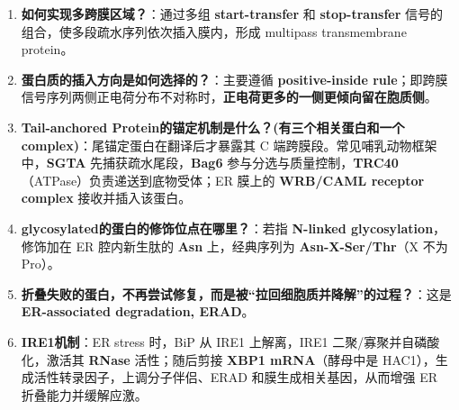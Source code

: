 \documentclass[12pt,fontset=none]{ctexart}
\begin{document}
\begin{enumerate}
\item \textbf{如何实现多跨膜区域？}：通过多组 \textbf{start-transfer} 和 \textbf{stop-transfer} 信号的组合，使多段疏水序列依次插入膜内，形成 multipass transmembrane protein。

\item \textbf{蛋白质的插入方向是如何选择的？}：主要遵循 \textbf{positive-inside rule}；即跨膜信号序列两侧正电荷分布不对称时，\textbf{正电荷更多的一侧更倾向留在胞质侧}。

\item \textbf{Tail-anchored Protein的锚定机制是什么？(有三个相关蛋白和一个complex)}：尾锚定蛋白在翻译后才暴露其 C 端跨膜段。常见哺乳动物框架中，\textbf{SGTA} 先捕获疏水尾段，\textbf{Bag6} 参与分选与质量控制，\textbf{TRC40}（ATPase）负责递送到底物受体；ER 膜上的 \textbf{WRB/CAML receptor complex} 接收并插入该蛋白。

\item \textbf{glycosylated的蛋白的修饰位点在哪里？}：若指 \textbf{N-linked glycosylation}，修饰加在 ER 腔内新生肽的 \textbf{Asn} 上，经典序列为 \textbf{Asn-X-Ser/Thr}（X 不为 Pro）。

\item \textbf{折叠失败的蛋白，不再尝试修复，而是被“拉回细胞质并降解”的过程？}：这是 \textbf{ER-associated degradation, ERAD}。

\item \textbf{IRE1机制}：ER stress 时，BiP 从 IRE1 上解离，IRE1 二聚/寡聚并自磷酸化，激活其 \textbf{RNase} 活性；随后剪接 \textbf{XBP1 mRNA}（酵母中是 HAC1），生成活性转录因子，上调分子伴侣、ERAD 和膜生成相关基因，从而增强 ER 折叠能力并缓解应激。
\end{enumerate}

\end{document}
